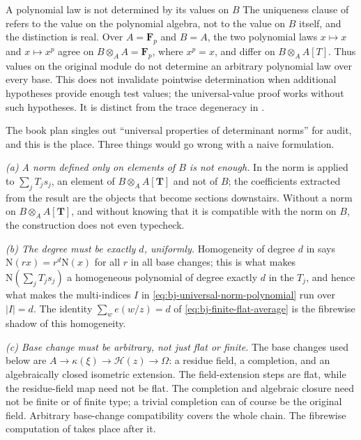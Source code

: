 \begin{warning}{A polynomial law is not determined by its values on $B$}
\label{warn:ch41-law-not-determined-on-B}
The uniqueness clause of  refers to the value on
the polynomial algebra, not to the value on $B$ itself, and the
distinction is real.  Over $A=\mathbf F_p$ and $B=A$, the two
polynomial laws $x\mapsto x$ and $x\mapsto x^p$ agree on
$B\otimes_AA=\mathbf F_p$, where $x^p=x$, and differ on
$B\otimes_AA[T]$.  Thus values on the original module do not determine an arbitrary
polynomial law over every base.  This does not invalidate pointwise
determination when additional hypotheses provide enough test values;
the universal-value proof works without such hypotheses. It is distinct from the trace degeneracy in .
\end{warning}

\begin{remark}
\label{rem:ch41-law-work}
The book plan singles out ``universal properties of determinant norms'' for
audit, and this is the place.  Three things would go wrong with a naive
formulation.

\emph{(a) A norm defined only on elements of $B$ is not enough.}  In
 the norm is applied to
$\sum_jT_js_j$, an element of $B\otimes_AA[\mathbf T]$ and not of
$B$; the coefficients extracted from the result are the objects that
become sections downstairs.  Without a norm on
$B\otimes_AA[\mathbf T]$, and without knowing that it is compatible with
the norm on $B$, the construction does not even typecheck.

\emph{(b) The degree must be exactly $d$, uniformly.}  Homogeneity of
degree $d$ in  says
$\mathrm N(rx)=r^d\mathrm N(x)$ for all $r$ in all base changes; this
is what makes $\mathrm N(\sum_jT_js_j)$ a homogeneous polynomial of degree
exactly $d$ in the $T_j$, and hence what makes the multi-indices $I$
in \eqref{eq:bj-universal-norm-polynomial} run over
$|I|=d$.  The identity $\sum_we(w/z)=d$ of
\eqref{eq:bj-finite-flat-average} is the fibrewise shadow of this
homogeneity.

\emph{(c) Base change must be arbitrary, not just flat or finite.}  The base
changes used below are $A\to\kappa(\xi)\to\mathcal H(z)\to\Omega$: a
residue field, a completion, and an algebraically closed isometric
extension.  The field-extension steps are flat, while the residue-field map need
not be flat.  The completion and algebraic closure need not be finite
or of finite type; a trivial completion can of course be the original
field.  Arbitrary base-change compatibility covers the whole chain.
The fibrewise computation of
 takes place after it.
\end{remark}

